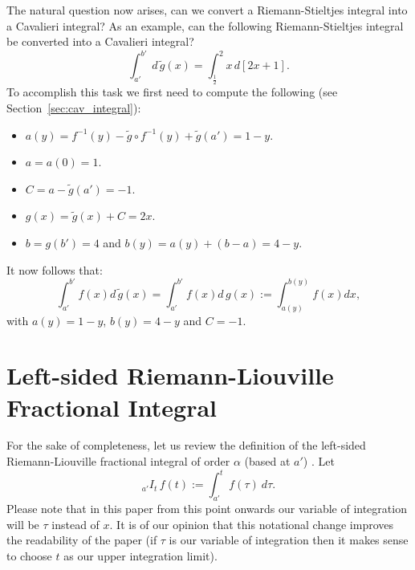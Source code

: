 \documentclass[twoside,reqno,11pt]{fcaa-var} %
\begin{document}

\noindent
The natural question now arises, can we convert a Riemann-Stieltjes integral into a Cavalieri integral? As an example, can the following Riemann-Stieltjes integral be converted into a Cavalieri integral?
\begin{equation}
\int_{a'}^{b'} \,d\,\widetilde{g}(x) = \int_{\frac{1}{2}}^2 x\,d[2x+1].
\end{equation}
To accomplish this task we first need to compute the following (see Section~\ref{sec:cav_integral}):
\begin{itemize}
 \item $a(y) = f^{-1}(y) - \widetilde{g}\circ f^{-1}(y)+ \widetilde{g}(a') = 1-y$.
 \item $a = a(0) = 1$.
 \item $C = a - \widetilde{g}(a') = -1$.
 \item $g(x) = \widetilde{g}(x) + C = 2x$.
 \item $b = g(b') = 4$ and $b(y) = a(y) + (b-a) = 4-y$.
\end{itemize}
It now follows that:
\begin{equation}
\int_{a'}^{b'} f(x)d\,\widetilde{g}(x) = \int_{a'}^{b'} f(x)d\,g(x) := \int_{a(y)}^{b(y)} f(x)dx, 
\end{equation}
with $a(y) = 1-y$, $b(y) = 4-y$ and $C=-1$.

\section{Left-sided Riemann-Liouville Fractional Integral}
\noindent
For the sake of completeness, let us review the definition of the left-sided Riemann-Liouville fractional integral of order $\alpha$ (based at $a'$) \cite{laurent1884}. Let
\begin{equation}
_{a'}I_t\, f(t) := \int_{a'}^t f(\tau)~d\tau.
\end{equation}
Please note that in this paper from this point onwards our variable of integration will be $\tau$ instead of $x$. It is of our opinion that this notational change improves the readability of the paper (if $\tau$ is our variable of integration then it makes sense to choose $t$ as our upper integration limit).\\
\end{document}
